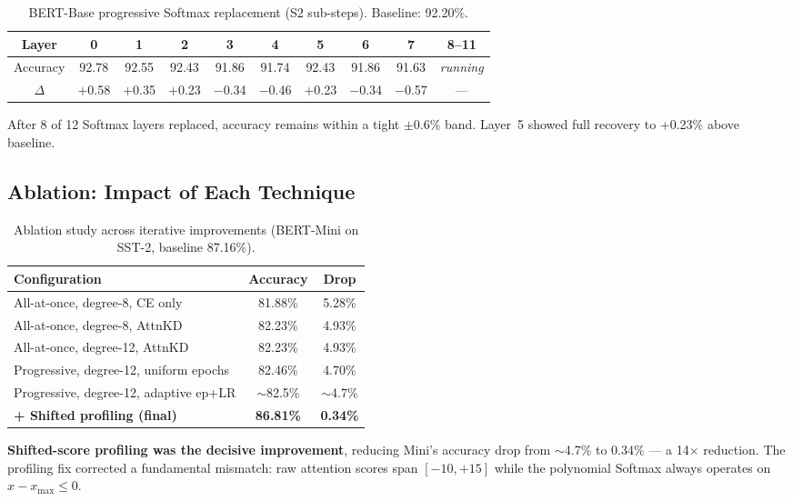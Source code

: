 \documentclass[12pt, a4paper]{article}
\begin{document}
\begin{table}[ht]
\centering
\caption{BERT-Base progressive Softmax replacement (S2 sub-steps). Baseline: 92.20\%.}
\label{tab:base_progressive}
\renewcommand{\arraystretch}{1.2}
\begin{tabular}{cccccccccc}
\toprule
\textbf{Layer} & 0 & 1 & 2 & 3 & 4 & 5 & 6 & 7 & 8--11 \\
\midrule
Accuracy & 92.78 & 92.55 & 92.43 & 91.86 & 91.74 & 92.43 & 91.86 & 91.63 & \textit{running} \\
$\Delta$ & +0.58 & +0.35 & +0.23 & $-$0.34 & $-$0.46 & +0.23 & $-$0.34 & $-$0.57 & --- \\
\bottomrule
\end{tabular}
\end{table}

After 8 of 12 Softmax layers replaced, accuracy remains within a tight $\pm$0.6\% band. Layer~5 showed full recovery to +0.23\% above baseline.

\subsection{Ablation: Impact of Each Technique}

\begin{table}[ht]
\centering
\caption{Ablation study across iterative improvements (BERT-Mini on SST-2, baseline 87.16\%).}
\label{tab:ablation}
\renewcommand{\arraystretch}{1.3}
\begin{tabular}{lcc}
\toprule
\textbf{Configuration} & \textbf{Accuracy} & \textbf{Drop} \\
\midrule
All-at-once, degree-8, CE only          & 81.88\% & 5.28\% \\
All-at-once, degree-8, AttnKD           & 82.23\% & 4.93\% \\
All-at-once, degree-12, AttnKD          & 82.23\% & 4.93\% \\
Progressive, degree-12, uniform epochs  & 82.46\% & 4.70\% \\
Progressive, degree-12, adaptive ep+LR  & $\sim$82.5\% & $\sim$4.7\% \\
\rowcolor{green!8}
\textbf{+ Shifted profiling (final)}    & \textbf{86.81\%} & \textbf{0.34\%} \\
\bottomrule
\end{tabular}
\end{table}

\textbf{Shifted-score profiling was the decisive improvement}, reducing Mini's accuracy drop from $\sim$4.7\% to 0.34\% --- a 14$\times$ reduction. The profiling fix corrected a fundamental mismatch: raw attention scores span $[-10, +15]$ while the polynomial Softmax always operates on $x - x_{\max} \leq 0$.
\end{document}

